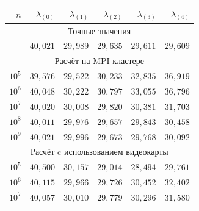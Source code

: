 \begin{table}[h!]
\begin{minipage}{8cm}
\begin{tabular}{r|r|r|r|r|r}

        \hline

        \footnotesize $n$& \footnotesize $\lambda_{(0)}$& \footnotesize $\lambda_{(1)}$& \footnotesize $\lambda_{(2)}$& \footnotesize $\lambda_{(3)}$& \footnotesize $\lambda_{(4)}$\\

        \hline

        \multicolumn{6}{c}{\rule{0mm}{12pt}Точные значения}\\

        \hline

        \rule{0mm}{12pt}

        &$40,021$&$29,989$&$29,635$&$29,611$&$29,609$\\

        \hline

        \multicolumn{6}{c}{\rule{0mm}{12pt}Расчёт на MPI-кластере}\\

        \hline

        \rule{0mm}{12pt}%

        $10^5$&$39,576$&$29,522$&$30,233$&$32,835$&$36,919$\\

        $10^6$&$40,048$&$30,222$&$30,797$&$33,055$&$36,796$\\

        $10^7$&$40,020$&$30,008$&$29,820$&$30,381$&$31,703$\\

        $10^8$&$40,011$&$29,976$&$29,657$&$29,843$&$30,458$\\

        $10^9$&$40,021$&$29,996$&$29,673$&$29,768$&$30,092$\\

        \hline

        \multicolumn{6}{c}{\rule{0mm}{12pt}Расчёт c использованием видеокарты}\\

        \hline

        \rule{0mm}{12pt}%

        $10^5$&$40,500$&$30,157$&$29,014$&$28,494$&$29,761$\\

        $10^6$&$40,115$&$29,966$&$29,726$&$30,452$&$32,402$\\

        $10^7$&$40,057$&$30,010$&$29,779$&$30,296$&$31,580$\\


\end{tabular}
\end{minipage}
\end{table}

